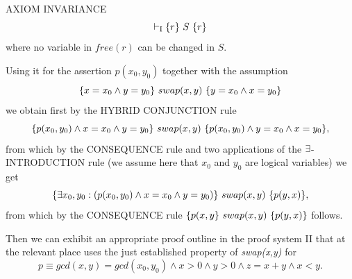 \documentclass[manuscript, screen, review]{acmart}
\begin{document}
\III

\NI
AXIOM INVARIANCE
\[ 
\vdash_{\mathrm{I}} \mbox{$\{{r}\}\ {S}\ \{{r}\}$}
\]
where no variable in $\mathit{free}(r)$ can be changed in $S$.
\III


Using it for the assertion $p(x_0,y_0)$
together with the assumption
\[
  \mbox{$\{{x=x_0 \wedge y=y_0}\}\ {swap(x,y)}\ \{{y=x_0 \wedge x=y_0}\}$}
\]
we obtain first by the HYBRID CONJUNCTION rule
\[
  \mbox{$\{{p(x_0,y_0) \wedge x=x_0 \wedge y=y_0}\}\ {swap(x,y)}\ \{{p(x_0,y_0) \wedge y=x_0 \wedge x=y_0}\}$},
\]
from which by the CONSEQUENCE rule and two applications of
the $\mbox{$\exists$}$-INTRODUCTION rule (we assume here that $x_0$ and $y_0$ are logical variables)
we get
\[
  \mbox{$\{{\mbox{$\exists$} x_0, y_0: (p(x_0,y_0) \wedge x=x_0 \wedge y=y_0)}\}\ {swap(x,y)}\ \{{p(y,x)}\}$},
\]
from which  by the CONSEQUENCE rule $\mbox{$\{{p(x,y}\}\ {swap(x,y)}\ \{{p(y,x)}\}$}$ follows.

Then we can exhibit an appropriate proof outline in the proof
system II that at the relevant place uses the just established property of 
\emph{swap(x,y)} for 
\[
  p \equiv gcd(x,y)=gcd(x_0, y_0)  \wedge x>0 \wedge y>0 \wedge z = x+y \wedge x < y.
\]
\end{document}
